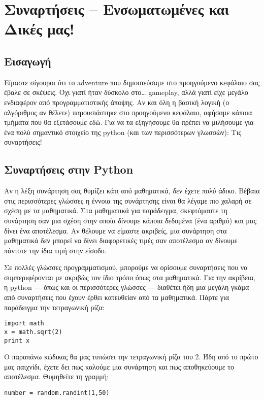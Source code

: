 \chapter{Συναρτήσεις -- Ενσωματωμένες και Δικές μας!}
\label{chap:functions-intro}
%
\section{Εισαγωγή}
%
Είμαστε σίγουροι ότι το adventure που δημοσιεύσαμε στο προηγούμενο κεφάλαιο 
σας έβαλε σε σκέψεις. Όχι γιατί ήταν δύσκολο στο\ldots{} gameplay, αλλά γιατί
είχε μεγάλο ενδιαφέρον από προγραμματιστικής  άποψης.  Αν και όλη η βασική
λογική (ο αλγόριθμος αν θέλετε) παρουσιάστηκε στο προηγούμενο κεφάλαιο,
αφήσαμε κάποια τμήματα που θα εξετάσουμε εδώ. Για να τα εξηγήσουμε θα
πρέπει να μιλήσουμε για ένα πολύ σημαντικό στοιχείο της python (και των
περισσότερων γλωσσών): Τις συναρτήσεις!
%
\section{Συναρτήσεις στην Python}
%
Αν η λέξη συνάρτηση σας θυμίζει κάτι από μαθηματικά, δεν έχετε πολύ
άδικο. Βέβαια στις περισσότερες γλώσσες η έννοια της συνάρτησης είναι
θα λέγαμε πιο χαλαρή σε σχέση με τα μαθηματικά. Στα μαθηματικά για
παράδειγμα, σκεφτόμαστε τη συνάρτηση σαν μια σχέση στην οποία δίνουμε
κάποια δεδομένα (ένα αριθμό) και μας δίνει ένα αποτέλεσμα. Αν θέλουμε
να είμαστε ακριβείς, μια συνάρτηση στα μαθηματικά δεν μπορεί να δίνει
διαφορετικές τιμές σαν αποτέλεσμα αν δίνουμε πάντοτε την ίδια τιμή στην
είσοδο.

Σε πολλές γλώσσες προγραμματισμού, μπορούμε να ορίσουμε συναρτήσεις που
να συμπεριφέρονται με ακριβώς τον ίδιο τρόπο όπως στα μαθηματικά. Για
την ακρίβεια, η python --- όπως και οι περισσότερες γλώσσες --- διαθέτει
ήδη μια μεγάλη γκάμα από συναρτήσεις που έχουν έρθει κατευθείαν από
τα μαθηματικά.  Πάρτε για παράδειγμα την τετραγωνική ρίζα:

\begin{verbatim}
import math
x = math.sqrt(2)
print x
\end{verbatim}

Ο παραπάνω κώδικας θα μας τυπώσει την τετραγωνική ρίζα του 2. Ήδη από
το πρώτο μας παιχνίδι, έχετε δει πως καλούμε μια συνάρτηση και πως
αποθηκεύουμε το αποτέλεσμα. Θυμηθείτε τη γραμμή:

\begin{verbatim}
number = random.randint(1,50)
\end{verbatim}

